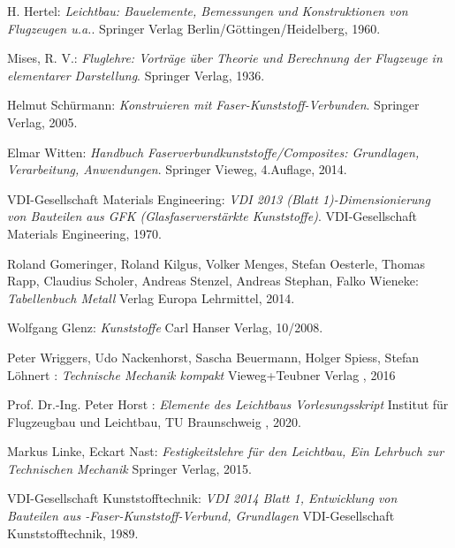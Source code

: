 \begingroup
\renewcommand{\section}[2]{}%
\begin{thebibliography}{99}          
	H. Hertel:
	\textit {Leichtbau: Bauelemente, Bemessungen und Konstruktionen von Flugzeugen u.a.}.
	Springer Verlag Berlin/Göttingen/Heidelberg, 1960.
	
	Mises, R. V.:
	\textit {Fluglehre: Vorträge über Theorie und Berechnung der Flugzeuge in elementarer Darstellung}.
	Springer Verlag, 1936.
	
	Helmut Schürmann:
	\textit {Konstruieren mit Faser-Kunststoff-Verbunden}.
	Springer Verlag, 2005.
	
	Elmar Witten:
	\textit {Handbuch Faserverbundkunststoffe/Composites: Grundlagen, Verarbeitung, Anwendungen}.
	Springer Vieweg, 4.Auflage, 2014.
	
	VDI-Gesellschaft Materials Engineering:
	\textit{VDI 2013 (Blatt 1)-Dimensionierung von Bauteilen aus GFK (Glasfaserverstärkte Kunststoffe)}.
	VDI-Gesellschaft Materials Engineering, 1970.
	
	Roland Gomeringer, Roland Kilgus, Volker Menges, Stefan Oesterle, Thomas Rapp, Claudius Scholer, Andreas Stenzel, Andreas Stephan, Falko Wieneke:
	\textit{Tabellenbuch Metall}
	Verlag Europa Lehrmittel, 2014.
	
	Wolfgang Glenz:
	\textit{Kunststoffe}
	Carl Hanser Verlag, 10/2008.
	
	Peter Wriggers, Udo Nackenhorst, Sascha Beuermann, Holger Spiess, Stefan Löhnert :
	\textit{Technische Mechanik kompakt}
	Vieweg+Teubner Verlag , 2016
	
	Prof. Dr.-Ing. Peter Horst :
	\textit{Elemente des Leichtbaus Vorlesungsskript}
	Institut für Flugzeugbau und Leichtbau, TU Braunschweig , 2020.

	Markus Linke, Eckart Nast:
	\textit{Festigkeitslehre für den Leichtbau, Ein Lehrbuch zur Technischen Mechanik}
	Springer Verlag, 2015.
	
	VDI-Gesellschaft Kunststofftechnik:
	\textit{VDI 2014 Blatt 1, Entwicklung von Bauteilen aus -Faser-Kunststoff-Verbund, Grundlagen}
	VDI-Gesellschaft Kunststofftechnik, 1989.


\end{thebibliography}
